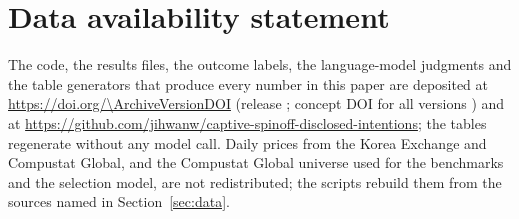 \section*{Data availability statement}
The code, the results files, the outcome labels, the language-model judgments and the table generators that produce every number in this paper are deposited at \url{https://doi.org/\ArchiveVersionDOI} (release \ArchiveTag; concept DOI for all versions \ArchiveConceptDOI) and at \url{https://github.com/jihwanw/captive-spinoff-disclosed-intentions}; the tables regenerate without any model call. Daily prices from the Korea Exchange and Compustat Global, and the Compustat Global universe used for the benchmarks and the selection model, are not redistributed; the scripts rebuild them from the sources named in Section~\ref{sec:data}.
